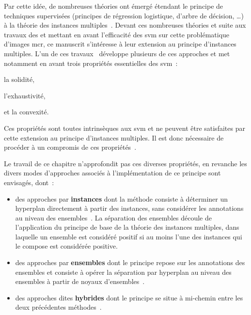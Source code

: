 Par cette idée, de nombreuses théories ont émergé étendant le principe de techniques supervisées (principes de régression logistique, d'arbre de décision, \ldots) à la théorie des instances multiples~\cite{Maron1998,Xu2004,Blockeel2005}. Devant ces nombreuses théories et suite aux travaux des  et  mettant en avant l'efficacité des \gls{svm} sur cette problématique d'images \gls{mcr}, ce manuscrit s'intéresse à leur extension au principe d'instances multiples. L'un de ces travaux~\cite{Doran2014} développe plusieurs de ces approches et met notamment en avant trois propriétés essentielles des \gls{svm}~:
\begin{inlinerate}
    \item la solidité,
    \item l'exhaustivité,
    \item et la convexité.
\end{inlinerate} Ces propriétés sont toutes intrinsèques aux \gls{svm} et ne peuvent être satisfaites par cette extension au principe d'instances multiples. Il est donc nécessaire de procéder à un compromis de ces propriétés~\cite{Doran2014}.\par

Le travail de ce chapitre n'approfondit pas ces diverses propriétés, en revanche les divers modes d'approches associés à l'implémentation de ce principe sont envisagés, dont~: 
\begin{itemize}
    \item des approches par \textbf{instances} dont la méthode consiste à déterminer un hyperplan directement à partir des instances, sans considérer les annotations au niveau des ensembles~\cite{Andrews2003}. La séparation des ensembles découle de l'application du principe de base de la théorie des instances multiples, dans laquelle un ensemble est considéré positif si au moins l'une des instances qui le compose est considérée positive.
    \item des approches par \textbf{ensembles} dont le principe repose sur les annotations des ensembles et consiste à opérer la séparation par hyperplan au niveau des ensembles à partir de noyaux d'ensembles~\cite{Gartner2002}.
    \item des approches dites \textbf{hybrides} dont le principe se situe à mi-chemin entre les deux précédentes méthodes~\cite{Bunescu2007}.
\end{itemize}\par 

